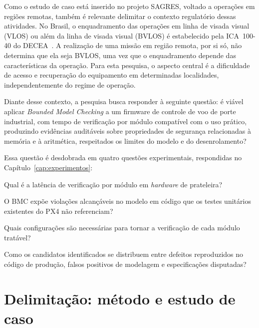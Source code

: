 Como o estudo de caso está inserido no projeto SAGRES, voltado a operações em regiões remotas, também é relevante delimitar o contexto regulatório dessas atividades. No Brasil, o enquadramento das operações em linha de visada visual (VLOS) ou além da linha de visada visual (BVLOS) é estabelecido pela ICA~100-40 do DECEA~\cite{DECEA_ICA10040}. A realização de uma missão em região remota, por si só, não determina que ela seja BVLOS, uma vez que o enquadramento depende das características da operação. Para esta pesquisa, o aspecto central é a dificuldade de acesso e recuperação do equipamento em determinadas localidades, independentemente do regime de operação.

Diante desse contexto, a pesquisa busca responder à seguinte questão: é viável aplicar \textit{Bounded Model Checking} a um firmware de controle de voo de porte industrial, com tempo de verificação por módulo compatível com o uso prático, produzindo evidências auditáveis sobre propriedades de segurança relacionadas à memória e à aritmética, respeitados os limites do modelo e do desenrolamento?

Essa questão é desdobrada em quatro questões experimentais, respondidas no Capítulo~\ref{cap:experimentos}:

\begin{description}[leftmargin=1.5cm, style=nextline]
\item[\textbf{QE1}] Qual é a latência de verificação por módulo em \textit{hardware} de prateleira?

\item[\textbf{QE2}] O BMC expõe violações alcançáveis no modelo em código que os testes unitários existentes do PX4 não referenciam?

\item[\textbf{QE3}] Quais configurações são necessárias para tornar a verificação de cada módulo tratável?

\item[\textbf{QE4}] Como os candidatos identificados se distribuem entre defeitos reproduzidos no código de produção, falsos positivos de modelagem e especificações disputadas?
\end{description}

\section{Delimitação: método e estudo de caso}
\label{sec:delimitacao}


